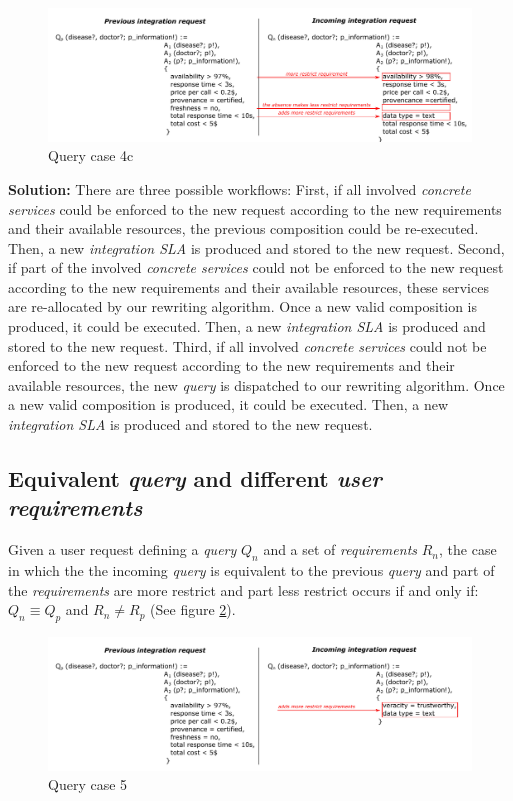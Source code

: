 \begin{figure}[h!]
\center
\includegraphics[scale=0.85]{figures/query-case-4c.pdf}\caption{Query case 4c} \label{fig:case4c}
\end{figure}

\bigskip
\noindent \textbf{Solution:} There are three possible workflows: First, if all involved \textsl{concrete services} could be enforced to the new request according to the new requirements and their available resources, the previous composition could be re-executed. Then, a new \textsl{integration SLA} is produced and stored to the new request. Second, if part of the involved \textsl{concrete services} could not be enforced to the new request according to the new requirements and their available resources, these services are re-allocated by our rewriting algorithm. Once a new valid composition is produced, it  could be executed. Then, a new \textsl{integration SLA} is produced and stored to the new request. Third, if all involved \textsl{concrete services} could not be enforced to the new request according to the new requirements and their available resources, the new \textsl{query} is dispatched to our rewriting algorithm. Once a new valid composition is produced, it  could be executed. Then, a new \textsl{integration SLA} is produced and stored to the new request.

\subsection{Equivalent \textsl{query} and different \textsl{user requirements}}
Given a user request defining a \textsl{query} $Q_{n}$ and a set of \textsl{requirements} $R_{n}$, the case in which the the incoming \textsl{query} is equivalent to the previous \textsl{query} and part of the \textsl{requirements} are more restrict and part less restrict occurs if and only if: $Q_{n} \equiv Q_{p}$ and $R_{n} \neq R_{p}$ (See figure \ref{fig:case5}).

\begin{figure}[h!]
\center
\includegraphics[scale=0.85]{figures/query-case-5.pdf}\caption{Query case 5} \label{fig:case5}
\end{figure}

